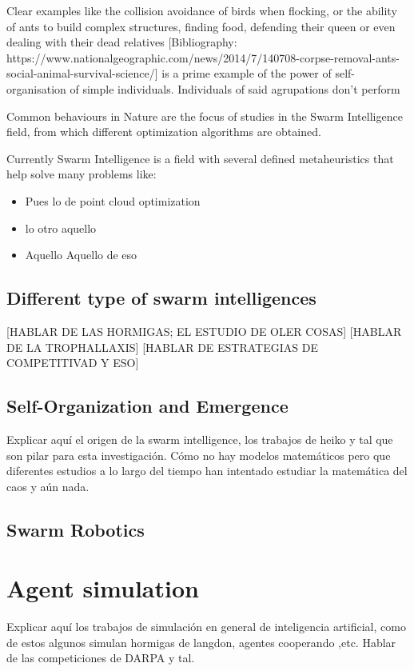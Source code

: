 Clear examples like the collision avoidance of birds when flocking, or the ability of ants to build complex structures, finding food, defending their queen or even dealing with their dead relatives [Bibliography: https://www.nationalgeographic.com/news/2014/7/140708-corpse-removal-ants-social-animal-survival-science/] is a prime example of the power of self-organisation of simple individuals. Individuals of said agrupations don't perform



Common behaviours in Nature are the focus of studies in the Swarm Intelligence field, from which different optimization algorithms are obtained.

Currently Swarm Intelligence is a field with several defined metaheuristics that help solve many problems like:

\begin{itemize}
\item Pues lo de point cloud optimization
\item lo otro aquello
\item Aquello
	\subitem Aquello de eso
\end{itemize}

\subsection{Different type of swarm intelligences}
[HABLAR DE LAS HORMIGAS; EL ESTUDIO DE OLER COSAS]
[HABLAR DE LA TROPHALLAXIS]
[HABLAR DE ESTRATEGIAS DE COMPETITIVAD Y ESO]

\subsection{Self-Organization and Emergence}

Explicar aquí el origen de la swarm intelligence, los trabajos de heiko y tal que son pilar para esta investigación. Cómo no hay modelos matemáticos pero que diferentes estudios a lo largo del tiempo han intentado estudiar la matemática del caos y aún nada.

\subsection{Swarm Robotics}

\section{Agent simulation}
Explicar aquí los trabajos de simulación en general de inteligencia artificial, como de estos algunos simulan hormigas de langdon, agentes cooperando ,etc. Hablar de las competiciones de DARPA y tal.

